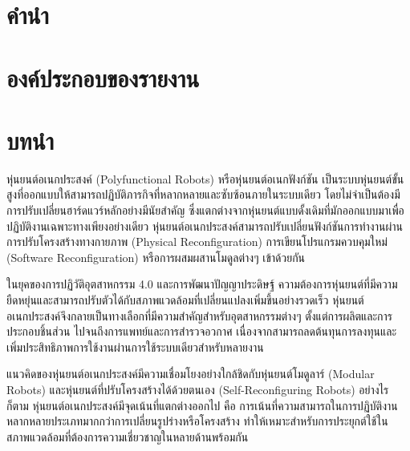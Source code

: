 \documentclass[a4paper]{article}
\begin{document}
\setcounter{page}{1}

\section*{คำนำ}

\newpage

\section*{องค์ประกอบของรายงาน}

\newpage


\section{บทนำ}
หุ่นยนต์อเนกประสงค์ (Polyfunctional Robots) หรือหุ่นยนต์อเนกฟังก์ชัน เป็นระบบหุ่นยนต์ขั้นสูงที่ออกแบบให้สามารถปฏิบัติภารกิจที่หลากหลายและซับซ้อนภายในระบบเดียว โดยไม่จำเป็นต้องมีการปรับเปลี่ยนฮาร์ดแวร์หลักอย่างมีนัยสำคัญ \parencite{liang2025decoding} ซึ่งแตกต่างจากหุ่นยนต์แบบดั้งเดิมที่มักออกแบบมาเพื่อปฏิบัติงานเฉพาะทางเพียงอย่างเดียว หุ่นยนต์อเนกประสงค์สามารถปรับเปลี่ยนฟังก์ชันการทำงานผ่านการปรับโครงสร้างทางกายภาพ (Physical Reconfiguration) การเขียนโปรแกรมควบคุมใหม่ (Software Reconfiguration) หรือการผสมผสานโมดูลต่างๆ เข้าด้วยกัน \parencite{post2023modular}

ในยุคของการปฏิวัติอุตสาหกรรม 4.0 และการพัฒนาปัญญาประดิษฐ์ ความต้องการหุ่นยนต์ที่มีความยืดหยุ่นและสามารถปรับตัวได้กับสภาพแวดล้อมที่เปลี่ยนแปลงเพิ่มขึ้นอย่างรวดเร็ว \parencite{mohammadi2023mobile} หุ่นยนต์อเนกประสงค์จึงกลายเป็นทางเลือกที่มีความสำคัญสำหรับอุตสาหกรรมต่างๆ ตั้งแต่การผลิตและการประกอบชิ้นส่วน ไปจนถึงการแพทย์และการสำรวจอวกาศ เนื่องจากสามารถลดต้นทุนการลงทุนและเพิ่มประสิทธิภาพการใช้งานผ่านการใช้ระบบเดียวสำหรับหลายงาน

แนวคิดของหุ่นยนต์อเนกประสงค์มีความเชื่อมโยงอย่างใกล้ชิดกับหุ่นยนต์โมดูลาร์ (Modular Robots) และหุ่นยนต์ที่ปรับโครงสร้างได้ด้วยตนเอง (Self-Reconfiguring Robots) \parencite{seo2019modular} อย่างไรก็ตาม หุ่นยนต์อเนกประสงค์มีจุดเน้นที่แตกต่างออกไป คือ การเน้นที่ความสามารถในการปฏิบัติงานหลากหลายประเภทมากกว่าการเปลี่ยนรูปร่างหรือโครงสร้าง ทำให้เหมาะสำหรับการประยุกต์ใช้ในสภาพแวดล้อมที่ต้องการความเชี่ยวชาญในหลายด้านพร้อมกัน
\end{document}
